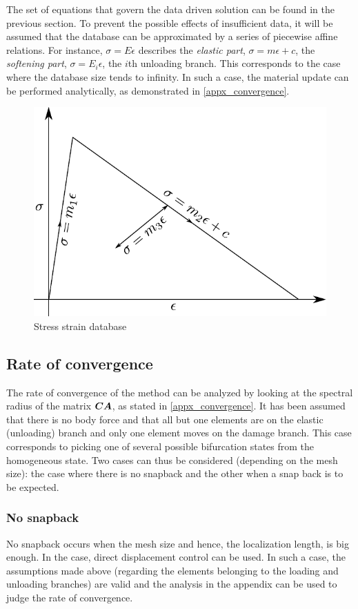\documentclass[11pt]{elsarticle}
\begin{document}
The set of equations that govern the data driven solution can be found in the previous section. To prevent the possible effects of insufficient data, it will be assumed that the database can be approximated by a series of piecewise affine relations. For instance, $\sigma=E \epsilon$ describes the \textit{elastic part}, $\sigma = m\epsilon + c$, the \textit{softening part}, $\sigma = E_i \epsilon$, the $i$th unloading branch. This corresponds to the case where the database size tends to infinity. In such a case, the material update can be performed analytically, as demonstrated in \ref{appx_convergence}. 

\begin{figure}
	\centering
	\includegraphics[width=0.4\linewidth]{Images/database_actual.pdf}
	\caption{Stress strain database \label{database_actual}}
\end{figure}

\subsection{Rate of convergence}
The rate of convergence of the method can be analyzed by looking at the spectral radius of the matrix $\mbox{\boldmath $C$} \mbox{\boldmath $A$} $, as stated in \ref{appx_convergence}. It has been assumed that there is no body force and that all but one elements are on the elastic (unloading) branch and only one element moves on the damage branch. This case corresponds to picking one of several possible bifurcation states from the homogeneous state. Two cases can thus be considered (depending on the mesh size): the case where there is no snapback and the other when a snap back is to be expected. 

\subsubsection*{No snapback}
No snapback occurs when the mesh size and hence, the localization length, is big enough. In the case, direct displacement control can be used. In such a case, the assumptions made above (regarding the elements belonging to the loading and unloading branches) are valid and the analysis in the appendix can be used to judge the rate of convergence. 
\end{document}
